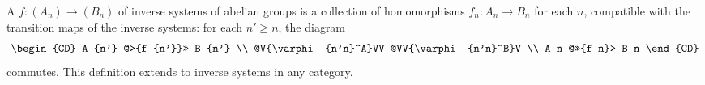 A  $f: (A_n) \to (B_n)$ of inverse systems of abelian groups is a collection of homomorphisms $f_n: A_n \to B_n$ for each $n$, compatible with the transition maps of the inverse systems: for each $n' \geq n$, the diagram
$$
\begin{CD}
A_{n'} @>{f_{n'}}>> B_{n'} \\
@V{\varphi_{n'n}^A}VV @VV{\varphi_{n'n}^B}V \\
A_n @>>{f_n}> B_n
\end{CD}
$$
commutes. This definition extends to inverse systems in any category.
